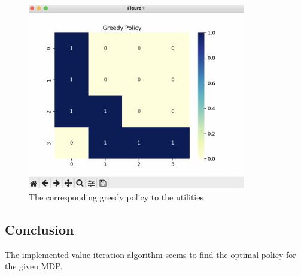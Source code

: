 \documentclass{article}
\begin{document}
\begin{figure}[hbtp]
    \centering
    \includegraphics[width=0.85\textwidth]{images/greedypolicy.png}
    \caption{The corresponding greedy policy to the utilities}
    \label{fig:image2}
\end{figure}

\subsection*{Conclusion}

The implemented value iteration algorithm seems to find the optimal policy for the given MDP.
\end{document}

